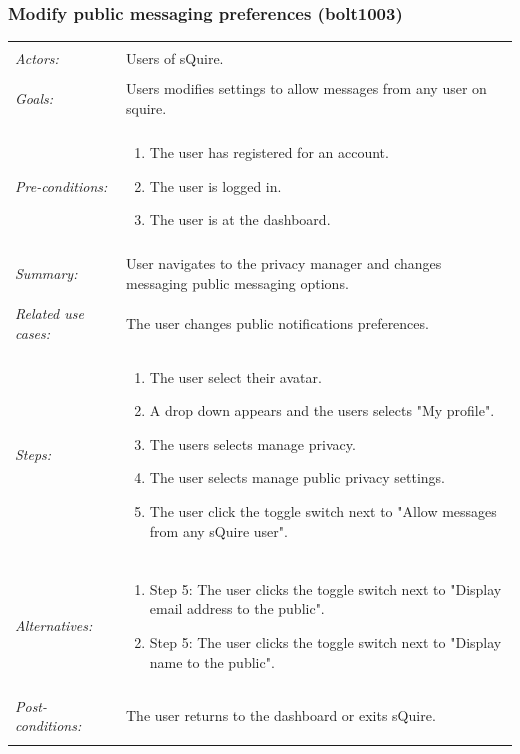 \documentclass[11pt]{report}
\begin{document}
\subsubsection{Modify public messaging preferences (bolt1003)}
\begin{tabular}{ p{2cm} p{12cm} }
 \hline
 \\
 \textit{Actors:} & Users of sQuire. \\ 
 \\
 \textit{Goals:} & Users modifies settings to allow messages from any user on squire. \\
 \\
 \textit{Pre-conditions:} & \begin{enumerate}
  \item The user has registered for an account.
  \item The user is logged in.
  \item The user is at the dashboard.
 \end{enumerate} \\
 \\
 \textit{Summary:} & User navigates to the privacy manager and changes messaging public messaging options.\\ 
 \\
 \textit{Related use cases:} & The user changes public notifications preferences. \\ 
 \\
 \textit{Steps:} & \begin{enumerate}
  \item The user select their avatar.
  \item A drop down appears and the users selects "My profile".
  \item The users selects manage privacy.
  \item The user selects manage public privacy settings.
  \item The user click the toggle switch next to "Allow messages from any sQuire user".
 \end{enumerate} \\
 \\
 \textit{Alternatives:} & \begin{enumerate} 
  \item Step 5: The user clicks the toggle switch next to "Display email address to the public".
  \item Step 5: The user clicks the toggle switch next to "Display name to the public".
 \end{enumerate} \\
 \\
 \textit{Post-conditions:} & The user returns to the dashboard or exits sQuire. \\
 \\
\hline
\end{tabular}
\end{document}
